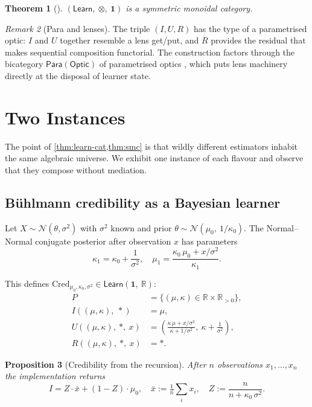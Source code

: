 \documentclass[journal,10pt]{IEEEtran}
\theoremstyle{plain}
\newtheorem{theorem}{Theorem}
\newtheorem{proposition}[theorem]{Proposition}
\theoremstyle{definition}
\theoremstyle{remark}
\newtheorem{remark}[theorem]{Remark}
\newcommand{\Learn}{\mathsf{Learn}}
\newcommand{\Para}{\mathsf{Para}}
\newcommand{\Optic}{\mathsf{Optic}}
\begin{document}
\begin{theorem}[\cite{CGGWZ}]
\label{thm:smc}
$(\Learn,\ \otimes,\ \mathbf{1})$ is a symmetric monoidal category.
\end{theorem}

\begin{remark}[Para and lenses]
The triple $(I, U, R)$ has the type of a parametrised optic: $I$ and
$U$ together resemble a lens get/put, and $R$ provides the residual
that makes sequential composition functorial. The construction
factors through the bicategory $\Para(\Optic)$ of parametrised optics
\cite{CapucciGavranovicHedgesRischel}, which puts lens machinery
directly at the disposal of learner state.
\end{remark}

\section{Two Instances}
\label{sec:instances}

The point of \cref{thm:learn-cat,thm:smc} is that wildly different
estimators inhabit the same algebraic universe. We exhibit one
instance of each flavour and observe that they compose without
mediation.

\subsection{B\"uhlmann credibility as a Bayesian learner}
\label{sec:credibility}

Let $X \sim \mathcal{N}(\theta, \sigma^2)$ with $\sigma^2$ known and
prior $\theta \sim \mathcal{N}(\mu_0,\ 1/\kappa_0)$. The
Normal--Normal conjugate posterior after observation $x$ has
parameters
\[
\kappa_1 = \kappa_0 + \frac{1}{\sigma^2},
\quad
\mu_1 = \frac{\kappa_0\, \mu_0 + x/\sigma^2}{\kappa_1}.
\]

This defines
$\mathrm{Cred}_{\mu_0, \kappa_0, \sigma^2}
   \in \Learn(\mathbf{1},\ \mathbb{R})$:
\begin{align*}
P &= \{(\mu, \kappa) \in \mathbb{R} \times \mathbb{R}_{>0}\}, \\
I((\mu, \kappa),\ *) &= \mu, \\
U((\mu, \kappa),\ *,\ x)
  &= \left(
       \frac{\kappa\, \mu + x/\sigma^2}{\kappa + 1/\sigma^2},\
       \kappa + \frac{1}{\sigma^2}
     \right), \\
R((\mu, \kappa),\ *,\ x) &= *.
\end{align*}

\begin{proposition}[Credibility from the recursion]
\label{prop:buhlmann}
After $n$ observations $x_1, \ldots, x_n$ the implementation returns
\[
I = Z \cdot \bar{x} + (1 - Z) \cdot \mu_0,
\quad
\bar{x} := \tfrac{1}{n} \textstyle\sum_i x_i,
\quad
Z := \frac{n}{n + \kappa_0\, \sigma^2}.
\]
\end{proposition}
\end{document}
